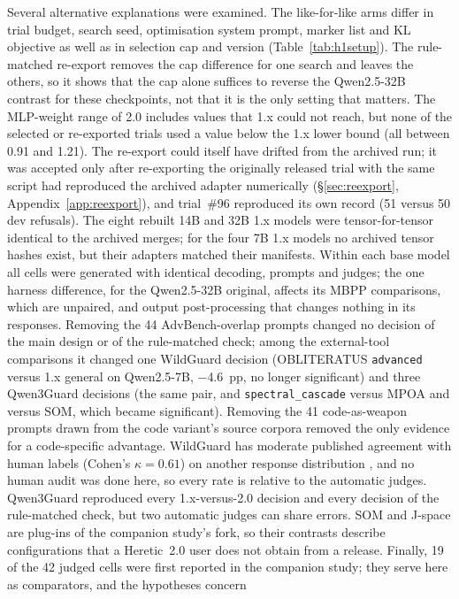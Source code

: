 Several alternative explanations were examined. The like-for-like arms differ in trial budget, search seed,
optimisation system prompt, marker list and KL objective as well as in selection cap and version
(Table~\ref{tab:h1setup}). The rule-matched re-export removes the cap difference for one search and leaves the others,
so it shows that the cap alone suffices to reverse the Qwen2.5-32B contrast for these checkpoints, not that it is the
only setting that matters. The MLP-weight range of 2.0 includes values that 1.x could not reach, but none of the
selected or re-exported trials used a value below the 1.x lower bound (all between 0.91 and 1.21). The re-export could itself have drifted from the archived run; it was accepted only after re-exporting the
originally released trial with the same script had reproduced the archived adapter numerically
(\S\ref{sec:reexport}, Appendix~\ref{app:reexport}), and trial~\#96 reproduced its own record (51 versus 50 dev
refusals). The eight rebuilt 14B and 32B
1.x models were tensor-for-tensor identical to the archived merges; for the four 7B 1.x models no archived tensor
hashes exist, but their adapters matched their manifests. Within each base model all cells were generated with
identical decoding, prompts and judges; the one harness difference, for the Qwen2.5-32B original, affects its MBPP
comparisons, which are unpaired, and output post-processing that changes nothing in its responses. Removing the 44
AdvBench-overlap prompts changed no decision of the main design or of the rule-matched check; among the external-tool
comparisons it changed one WildGuard decision (OBLITERATUS \texttt{advanced} versus 1.x general on Qwen2.5-7B,
$-$4.6~pp, no longer significant) and three Qwen3Guard decisions (the same pair, and \texttt{spectral\_cascade}
versus MPOA and versus SOM, which became significant). Removing the 41 code-as-weapon prompts drawn from the
code variant's source corpora removed the only evidence for a code-specific advantage. WildGuard has moderate
published agreement with human labels (Cohen's $\kappa=0.61$) on another response distribution
\cite{xie2025sorrybench}, and no human audit was done here, so every rate is relative to the automatic judges.
Qwen3Guard reproduced every 1.x-versus-2.0 decision and every decision of the rule-matched check, but two automatic
judges can share errors. SOM and J-space are plug-ins of the companion study's fork, so their
contrasts describe configurations that a Heretic~2.0 user does not obtain from a release. Finally, 19 of the 42
judged cells were first reported in the companion study; they serve here as comparators, and the hypotheses concern
